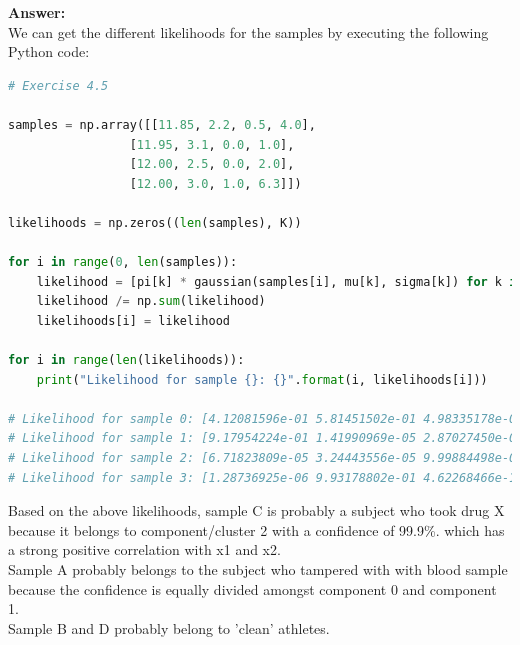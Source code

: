 \documentclass[a4paper]{article}
\begin{document}
\textbf{Answer:}\\

We can get the different likelihoods for the samples by executing the following Python code:

\begin{lstlisting}[language=Python]
# Exercise 4.5

samples = np.array([[11.85, 2.2, 0.5, 4.0],
                 [11.95, 3.1, 0.0, 1.0],
                 [12.00, 2.5, 0.0, 2.0],
                 [12.00, 3.0, 1.0, 6.3]])

likelihoods = np.zeros((len(samples), K))

for i in range(0, len(samples)):
    likelihood = [pi[k] * gaussian(samples[i], mu[k], sigma[k]) for k in range(0, K)]
    likelihood /= np.sum(likelihood)
    likelihoods[i] = likelihood

for i in range(len(likelihoods)):
    print("Likelihood for sample {}: {}".format(i, likelihoods[i]))
    
# Likelihood for sample 0: [4.12081596e-01 5.81451502e-01 4.98335178e-04 5.96856647e-03]
# Likelihood for sample 1: [9.17954224e-01 1.41990969e-05 2.87027450e-05 8.20028744e-02]
# Likelihood for sample 2: [6.71823809e-05 3.24443556e-05 9.99884498e-01 1.58757605e-05]
# Likelihood for sample 3: [1.28736925e-06 9.93178802e-01 4.62268466e-12 6.81991031e-03]
\end{lstlisting}

Based on the above likelihoods, sample C is probably a subject who took drug X because it belongs to component/cluster 2 with a confidence of 99.9\%. which has a strong positive correlation with x1 and x2.\\
Sample A probably belongs to the subject who tampered with with blood sample because the confidence is equally divided amongst component 0 and component 1. \\
Sample B and D probably belong to 'clean' athletes.
\end{document}
